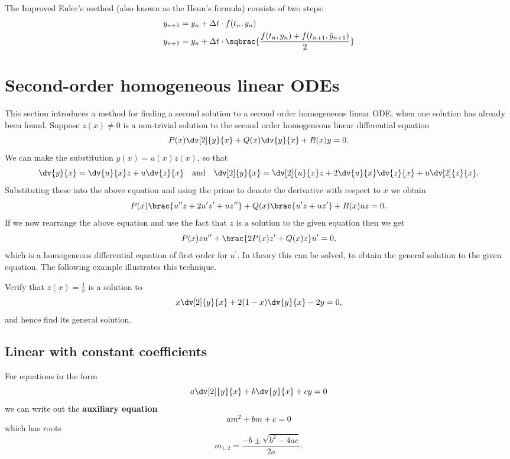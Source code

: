 The Improved Euler's method (also known as the Heun’s formula) consists of two steps:
\begin{equation}
\begin{split}
\bar{y}_{n+1}&=y_n+\Delta t\cdot f(t_n,y_n)\\
y_{n+1}&=y_n+\Delta t\cdot\sqbrac{\frac{f(t_n,y_n)+f(t_{n+1},\bar{y}_{n+1})}{2}}
\end{split}
\end{equation}
\pagebreak

\section{Second-order homogeneous linear ODEs}
This section introduces a method for finding a second solution to a second order homogeneous linear ODE, when one solution has already been found. Suppose $z(x)\neq0$ is a non-trivial solution to the second order homogeneous linear differential equation
\[ P(x)\dv[2]{y}{x}+Q(x)\dv{y}{x}+R(x)y=0. \]
We can make the substitution $y(x)=u(x)z(x)$, so that
\[ \dv{y}{x}=\dv{u}{x}z+u\dv{z}{x} \quad \text{and} \quad \dv[2]{y}{x}=\dv[2]{u}{x}z+2\dv{u}{x}\dv{z}{x}+u\dv[2]{z}{x}. \]
Substituting these into the above equation and using the prime to denote the derivative with respect to $x$ we obtain
\[ P(x)\brac{u^{\prime\prime}z+2u^\prime z^\prime+uz^{\prime\prime}}+Q(x)\brac{u^\prime z+uz^\prime}+R(x)uz=0. \]
If we now rearrange the above equation and use the fact that $z$ is a solution to the given equation then we get
\[ P(x)zu^{\prime\prime}+\brac{2P(x)z^\prime+Q(x)z}u^\prime=0, \]
which is a homogeneous differential equation of first order for $u^\prime$. In theory this can be solved, to obtain the general solution to the given equation. The following example illustrates this technique.

\begin{exercise}{}{}
Verify that $z(x)=\frac{1}{x}$ is a solution to
\[ x\dv[2]{y}{x}+2(1-x)\dv{y}{x}-2y=0, \]
and hence find its general solution.
\end{exercise}
\begin{solution}

\end{solution}


\subsection{Linear with constant coefficients}
For equations in the form 
\[ a\dv[2]{y}{x} + b\dv{y}{x} +cy = 0 \]
we can write out the \textbf{auxiliary equation}
\[ am^2+bm+c=0 \]
which has roots
\[ m_{1,2}=\frac{-b\pm \sqrt{b^2-4ac}}{2a}. \]

